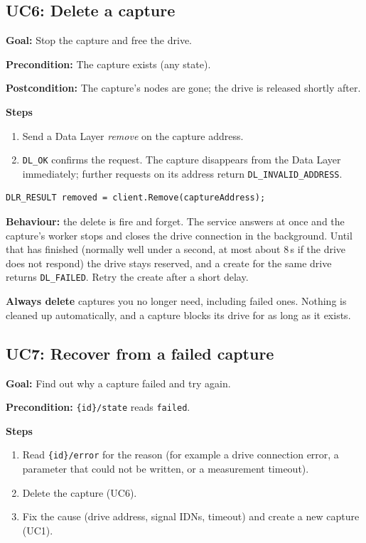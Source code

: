 \documentclass[11pt,a4paper]{article}
\newcommand{\dl}[1]{\texttt{#1}}
\newcommand{\res}[1]{\texttt{#1}}
\newenvironment{usecase}[1]
  {\subsection{#1}}
  {}
\newcommand{\ucfield}[2]{\par\noindent\textbf{#1:} #2\par}
\begin{document}
\begin{usecase}{UC6: Delete a capture}
\ucfield{Goal}{Stop the capture and free the drive.}
\ucfield{Precondition}{The capture exists (any state).}
\ucfield{Postcondition}{The capture's nodes are gone; the drive is released shortly after.}

\textbf{Steps}
\begin{enumerate}[nosep]
  \item Send a Data Layer \emph{remove} on the capture address.
  \item \res{DL\_OK} confirms the request. The capture disappears from the
        Data Layer immediately; further requests on its address return
        \res{DL\_INVALID\_ADDRESS}.
\end{enumerate}

\begin{lstlisting}[language={[Sharp]C}]
DLR_RESULT removed = client.Remove(captureAddress);
\end{lstlisting}

\textbf{Behaviour:} the delete is fire and forget. The service answers at once
and the capture's worker stops and closes the drive connection in the
background. Until that has finished (normally well under a second, at most
about 8\,s if the drive does not respond) the drive stays reserved, and a
create for the same drive returns \res{DL\_FAILED}. Retry the create after a
short delay.

\textbf{Always delete} captures you no longer need, including failed ones.
Nothing is cleaned up automatically, and a capture blocks its drive for as long
as it exists.
\end{usecase}

\begin{usecase}{UC7: Recover from a failed capture}
\ucfield{Goal}{Find out why a capture failed and try again.}
\ucfield{Precondition}{\dl{\{id\}/state} reads \dl{failed}.}

\textbf{Steps}
\begin{enumerate}[nosep]
  \item Read \dl{\{id\}/error} for the reason (for example a drive connection
        error, a parameter that could not be written, or a measurement timeout).
  \item Delete the capture (UC6).
  \item Fix the cause (drive address, signal IDNs, timeout) and create a new
        capture (UC1).
\end{enumerate}
\end{usecase}
\end{document}
